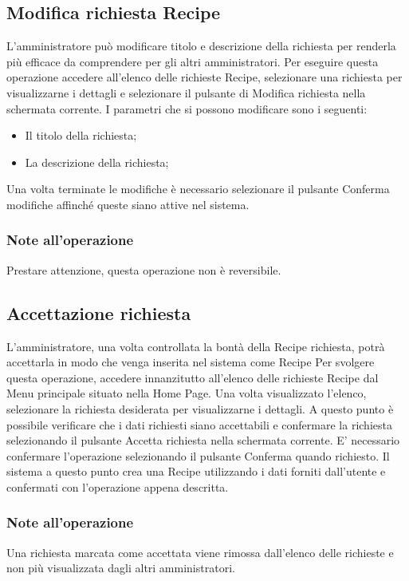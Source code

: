 	
	\subsection{Modifica richiesta Recipe}
	L'amministratore può modificare titolo e descrizione della richiesta per renderla più efficace da comprendere per gli altri amministratori.
	Per eseguire questa operazione accedere all'elenco delle richieste Recipe, selezionare una richiesta per visualizzarne i dettagli e selezionare il pulsante di Modifica richiesta nella schermata corrente.
	I parametri che si possono modificare sono i seguenti:
	\begin{itemize}
	 	\item Il titolo della richiesta;
	 	\item La descrizione della richiesta;
	\end{itemize}
	Una volta terminate le modifiche è necessario selezionare il pulsante Conferma modifiche affinché queste siano attive nel sistema.
	\subsubsection{Note all'operazione}
	Prestare attenzione, questa operazione non è reversibile.
	
	\subsection{Accettazione richiesta}
	L'amministratore, una volta controllata la bontà della Recipe richiesta, potrà accettarla in modo che venga inserita nel sistema come Recipe
	Per svolgere questa operazione, accedere innanzitutto all'elenco delle richieste Recipe dal Menu principale situato nella Home Page.
	Una volta visualizzato l'elenco, selezionare la richiesta desiderata per visualizzarne i dettagli.
	A questo punto è possibile verificare che i dati richiesti siano accettabili e confermare la richiesta selezionando il pulsante Accetta richiesta nella schermata corrente. 
	E' necessario confermare l'operazione selezionando il pulsante Conferma quando richiesto.
	Il sistema a questo punto crea una Recipe utilizzando i dati forniti dall'utente e confermati con l'operazione appena descritta.
	\subsubsection{Note all'operazione}
	Una richiesta marcata come accettata viene rimossa dall'elenco delle richieste e non più visualizzata dagli altri amministratori.
	
